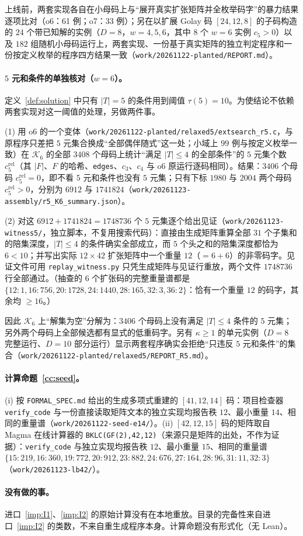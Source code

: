 \documentclass[11pt]{ctexart}
\theoremstyle{definition}
\begin{document}
上线前，两套实现各自在小母码上与“展开真实扩张矩阵并全枚举码字”的暴力结果逐项比对（o6：61 例；o7：33 例）；另在以扩展 Golay 码 $[24,12,8]$ 的子码构造的 $24$ 个带已知解的实例（$D=8$，$w=4,5,6$，其中 $8$ 个 $w=6$ 实例 $c_5>0$）以及 $182$ 组随机小母码运行上，两套实现、一份基于真实矩阵的独立判定程序和一份按定义枚举的程序四方结果一致（\texttt{work/20261122-planted/REPORT.md}）。

\paragraph{$5$ 元和条件的单独核对（$w=6$）。}定义~\ref{def:solution} 中只有 $|T|=5$ 的条件用到阈值 $\tau(5)=10$。为使结论不依赖两套实现对这一阈值的处理，另做两件事。

(1) 用 o6 的一个变体（\texttt{work/20261122-planted/relaxed5/extsearch\_r5.c}，与原程序只差把 $5$ 元集合换成“全部偶伴随式”这一处；小域上 $99$ 例与按定义枚举一致）在 $\mathcal K_6$ 的全部 $3408$ 个母码上统计“满足 $|T|\le4$ 的全部条件”的 $5$ 元集个数 $c_5^{\mathrm{rel}}$（其 $|F|$、$F$ 的哈希、\texttt{edges}、$c_3$、$c_4$ 与 o6 原运行逐码相同）。结果：$3406$ 个母码 $c_5^{\mathrm{rel}}=0$，即不看 $5$ 元和条件也没有 $5$ 元集；只有下标 $1980$ 与 $2004$ 两个母码 $c_5^{\mathrm{rel}}>0$，分别为 $6912$ 与 $1741824$（\texttt{work/20261123-assembly/r5\_K6\_summary.json}）。

(2) 对这 $6912+1741824=1748736$ 个 $5$ 元集逐个给出见证（\texttt{work/20261123-witness5/}，独立脚本，不复用搜索代码）：直接由生成矩阵重算全部 $31$ 个子集和的陪集深度，$|T|\le4$ 的条件确实全部成立，而 $5$ 个头之和的陪集深度都恰为 $6<10$；并写出实际 $12\times42$ 扩张矩阵中一个重量 $12$（$=6+6$）的非零码字。见证文件可用 \texttt{replay\_witness.py} 只凭生成矩阵与见证行重放，两个文件 $1748736$ 行全部通过。（抽查的 $6$ 个扩张码的完整重量谱都是 $\{12{:}1,16{:}756,20{:}1728,24{:}1440,28{:}165,32{:}3,36{:}2\}$：恰有一个重量 $12$ 的码字，其余均 $\ge16$。）

因此 $\mathcal K_6$ 上“解集为空”分解为：$3406$ 个母码上没有满足 $|T|\le4$ 条件的 $5$ 元集；另外两个母码上全部候选都有显式的低重码字。另有 $\kappa\ge1$ 的单元实例（$D=8$ 完整运行、$D=10$ 部分运行）显示两套程序确实会拒绝“只违反 $5$ 元和条件”的集合（\texttt{work/20261122-planted/relaxed5/REPORT\_R5.md}）。

\paragraph{计算命题~\ref{cc:seed}。}(i) 按 \texttt{FORMAL\_SPEC.md} 给出的生成多项式重建的 $[41,12,14]$ 码：项目检查器 \texttt{verify\_code} 与一份直接读取矩阵文本的独立实现均报告秩 $12$、最小重量 $14$、相同的重量谱（\texttt{work/20261122-seed-e14/}）。(ii) $[42,12,15]$ 码的矩阵取自 Magma 在线计算器的 \texttt{BKLC(GF(2),42,12)}（来源只是矩阵的出处，不作为证据）：\texttt{verify\_code} 与独立实现均报告秩 $12$、最小重量 $15$、相同的重量谱 $\{15{:}219,16{:}360,19{:}772,20{:}912,23{:}882,24{:}676,27{:}164,28{:}96,31{:}11,32{:}3\}$（\texttt{work/20261123-lb42/}）。

\paragraph{没有做的事。}进口~\ref{imp:I1}、\ref{imp:I2} 的原始计算没有在本地重放。目录的完备性来自进口~\ref{imp:I2} 的类数，不来自重生成程序本身。计算命题没有形式化（无 Lean）。
\end{document}
